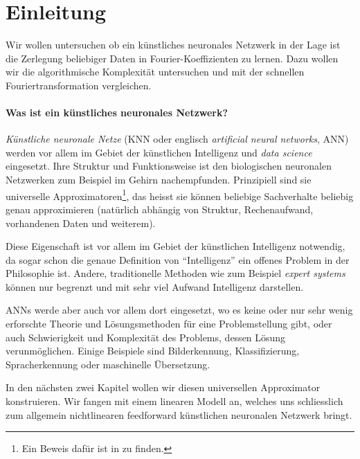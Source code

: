 %
%
%
%
\section{Einleitung\label{ml:section:einleitung}}

Wir wollen untersuchen ob ein künstliches neuronales Netzwerk in der Lage ist die Zerlegung beliebiger
Daten in Fourier-Koeffizienten zu lernen. Dazu wollen wir die algorithmische
Komplexität untersuchen und mit der schnellen Fouriertransformation vergleichen.

\paragraph{Was ist ein künstliches neuronales Netzwerk?} \emph{Künstliche neuronale Netze} (KNN
oder englisch \emph{artificial neural networks}, ANN) werden vor allem im Gebiet der
künstlichen Intelligenz und \emph{data science} eingesetzt. Ihre Struktur und Funktionsweise ist den
biologischen neuronalen Netzwerken zum Beispiel im Gehirn nachempfunden. Prinzipiell sind
sie universelle Approximatoren\footnote{Ein Beweis dafür ist in
\cite{ml:universala-approximator-theorem} zu finden.}, das heisst sie können beliebige
Sachverhalte beliebig genau approximieren (natürlich abhängig von Struktur, Rechenaufwand,
vorhandenen Daten und weiterem).

Diese Eigenschaft ist vor allem im Gebiet der künstlichen Intelligenz notwendig,
da sogar schon die genaue Definition von ``Intelligenz'' ein offenes Problem in der
Philosophie ist. Andere, traditionelle Methoden wie zum Beispiel \emph{expert systems} können
nur begrenzt und mit sehr viel Aufwand Intelligenz darstellen.

ANNs werde aber auch vor allem dort eingesetzt, wo es keine oder nur sehr wenig erforschte
Theorie und Lösungsmethoden für eine Problemstellung gibt, oder auch Schwierigkeit und
Komplexität des Problems, dessen Lösung verunmöglichen. Einige Beispiele sind
Bilderkennung, Klassifizierung, Spracherkennung oder maschinelle Übersetzung.

\smallskip
In den nächsten zwei Kapitel wollen wir diesen universellen Approximator konstruieren.
Wir fangen mit einem linearen Modell an, welches uns schliesslich zum allgemein
nichtlinearen feedforward künstlichen neuronalen Netzwerk bringt.
